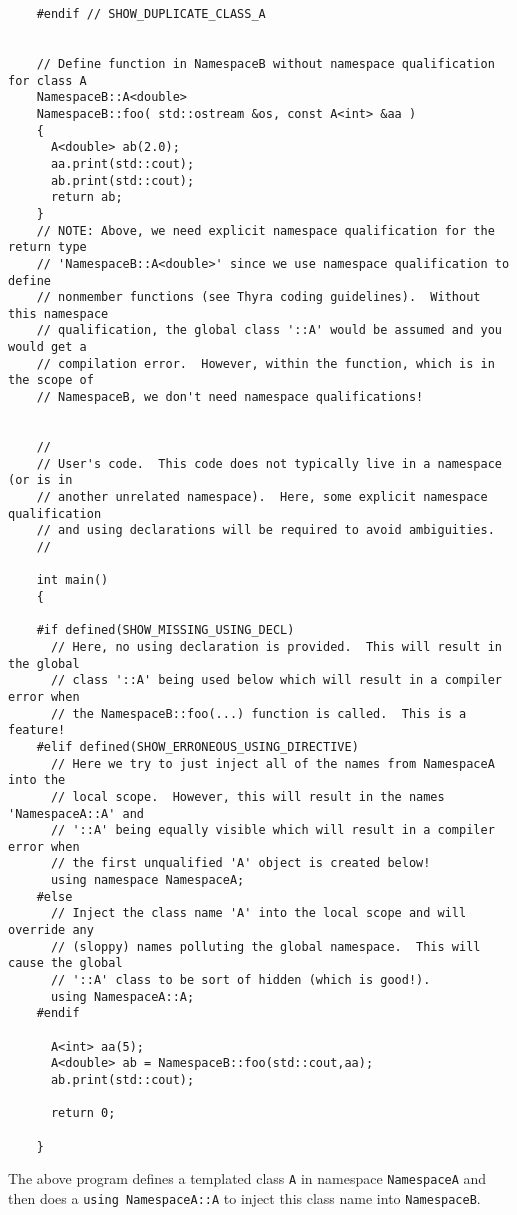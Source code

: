 {\begin{verbatim}
    #endif // SHOW_DUPLICATE_CLASS_A
    
    
    // Define function in NamespaceB without namespace qualification for class A
    NamespaceB::A<double>
    NamespaceB::foo( std::ostream &os, const A<int> &aa )
    {
      A<double> ab(2.0);
      aa.print(std::cout);
      ab.print(std::cout);
      return ab;
    }
    // NOTE: Above, we need explicit namespace qualification for the return type
    // 'NamespaceB::A<double>' since we use namespace qualification to define
    // nonmember functions (see Thyra coding guidelines).  Without this namespace
    // qualification, the global class '::A' would be assumed and you would get a
    // compilation error.  However, within the function, which is in the scope of
    // NamespaceB, we don't need namespace qualifications!
    
    
    //
    // User's code.  This code does not typically live in a namespace (or is in
    // another unrelated namespace).  Here, some explicit namespace qualification
    // and using declarations will be required to avoid ambiguities.
    //
    
    int main()
    {
    
    #if defined(SHOW_MISSING_USING_DECL)
      // Here, no using declaration is provided.  This will result in the global
      // class '::A' being used below which will result in a compiler error when
      // the NamespaceB::foo(...) function is called.  This is a feature!
    #elif defined(SHOW_ERRONEOUS_USING_DIRECTIVE)
      // Here we try to just inject all of the names from NamespaceA into the
      // local scope.  However, this will result in the names 'NamespaceA::A' and
      // '::A' being equally visible which will result in a compiler error when
      // the first unqualified 'A' object is created below!
      using namespace NamespaceA;
    #else
      // Inject the class name 'A' into the local scope and will override any
      // (sloppy) names polluting the global namespace.  This will cause the global
      // '::A' class to be sort of hidden (which is good!).
      using NamespaceA::A;
    #endif
    
      A<int> aa(5);
      A<double> ab = NamespaceB::foo(std::cout,aa);
      ab.print(std::cout);
      
      return 0;
      
    }
\end{verbatim}}

The above program defines a templated class {}\texttt{A} in namespace
{}\texttt{NamespaceA} and then does a {}\texttt{using NamespaceA::A} to inject
this class name into {}\texttt{NamespaceB}.

